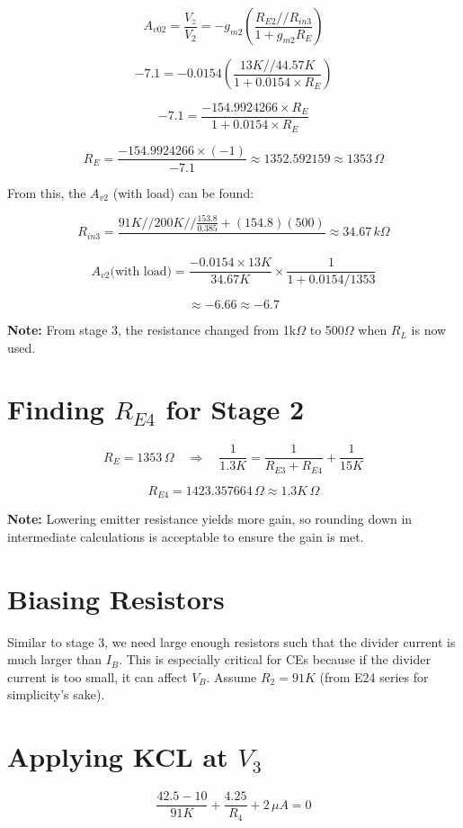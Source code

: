 \[
A_{v02} = \frac{V_z}{V_2} = -g_{m2} \left( \frac{R_{E2} // R_{in3}}{1 + g_{m2} R_E} \right)
\]

\[
-7.1 = -0.0154 \left(\frac{13K // 44.57K}{1 + 0.0154 \times R_{E}}\right)
\]

\[
-7.1 = \frac{-154.9924266 \times R_E}{1 + 0.0154 \times R_E}
\]

\[
R_E = \frac{-154.9924266 \times (-1)}{-7.1} \approx 1352.592159 \approx 1353 \, \Omega
\]

From this, the \(A_{v2}\) (with load) can be found:

\[
R_{in3} = \frac{91K // 200K // \frac{153.8}{0.385} + (154.8)(500)}{} \approx 34.67 \, k\Omega
\]

\[
A_{v2} \text{(with load)} = \frac{-0.0154 \times 13K}{34.67K} \times \frac{1}{1 + 0.0154 / 1353}
\]

\[
\approx -6.66 \approx -6.7
\]

\textbf{Note:} From stage 3, the resistance changed from 1k\(\Omega\) to 500\(\Omega\) when \(R_L\) is now used.

\section{Finding \(R_{E4}\) for Stage 2}

\[
R_E = 1353 \, \Omega \quad \Rightarrow \quad \frac{1}{1.3K} = \frac{1}{R_{E3} + R_{E4}} + \frac{1}{15K}
\]

\[
R_{E4} = 1423.357664 \, \Omega \approx 1.3K \, \Omega
\]

\textbf{Note:} Lowering emitter resistance yields more gain, so rounding down in intermediate calculations is acceptable to ensure the gain is met.

\section{Biasing Resistors}
Similar to stage 3, we need large enough resistors such that the divider current is much larger than \(I_B\). This is especially critical for CEs because if the divider current is too small, it can affect \(V_B\). Assume \(R_2 = 91K\) (from E24 series for simplicity's sake).

\section{Applying KCL at \(V_3\)}

\[
\frac{42.5 - 10}{91K} + \frac{4.25}{R_4} + 2 \, \mu A = 0
\]

